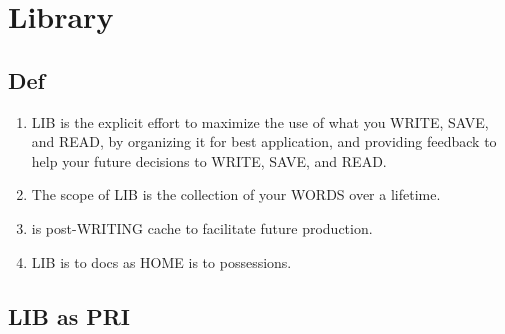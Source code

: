 \documentclass[
]{book}
\providecommand{\tightlist}{%
  \setlength{\itemsep}{0pt}\setlength{\parskip}{0pt}}
\begin{document}
\hypertarget{library}{%
\section{Library}\label{library}}

\hypertarget{def}{%
\subsection{Def}\label{def}}

\begin{enumerate}
\def\labelenumi{\arabic{enumi}.}
\setcounter{enumi}{70}
\tightlist
\item
  LIB is the explicit effort to maximize the use of what you WRITE, SAVE,
  and READ, by organizing it for best application, and providing feedback
  to help your future decisions to WRITE, SAVE, and READ.
\item
  The scope of LIB is the collection of your WORDS over a lifetime.
\item
  is post-WRITING cache to facilitate future production.
\item
  LIB is to docs as HOME is to possessions.
\end{enumerate}

\hypertarget{lib-as-pri}{%
\subsection{LIB as PRI}\label{lib-as-pri}}
\end{document}
